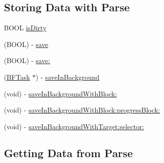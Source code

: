 \subsection*{Storing Data with Parse}
\label{_amgrpd3949ae48a80e9fe812460f63702600e}%


 

 \begin{DoxyCompactItemize}
\item 
B\+O\+O\+L \hyperlink{interface_p_f_file_a7c5c90890ac086b6acead25cb4777e2c}{is\+Dirty}
\item 
(B\+O\+O\+L) -\/ \hyperlink{interface_p_f_file_ac9426d716ea9b57546ac40237051df53}{save}
\item 
(B\+O\+O\+L) -\/ \hyperlink{interface_p_f_file_ac5465c3823e73dd5e17eab67b629b6dc}{save\+:}
\item 
(\hyperlink{interface_b_f_task}{B\+F\+Task} $\ast$) -\/ \hyperlink{interface_p_f_file_a93f883e430848b83e7ecd53811b00829}{save\+In\+Background}
\item 
(void) -\/ \hyperlink{interface_p_f_file_a8b38454eb589a3a64e48bf3ea327091a}{save\+In\+Background\+With\+Block\+:}
\item 
(void) -\/ \hyperlink{interface_p_f_file_a815a3e0ccf23f0e1c9c573ec38649258}{save\+In\+Background\+With\+Block\+:progress\+Block\+:}
\item 
(void) -\/ \hyperlink{interface_p_f_file_a962b01cfccc90ac5ffe6d009c31ff0af}{save\+In\+Background\+With\+Target\+:selector\+:}
\end{DoxyCompactItemize}
\subsection*{Getting Data from Parse}
\label{_amgrp9145cb8d0764228031272533e3c2f601}%


 

